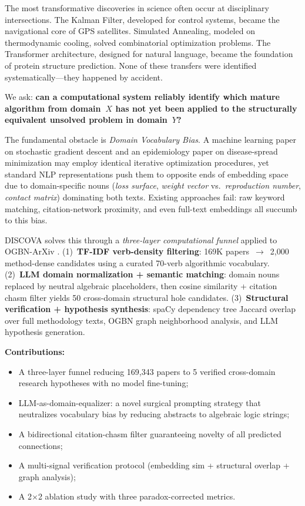 \documentclass[11pt]{article}
\begin{document}
The most transformative discoveries in science often occur at disciplinary
intersections. The Kalman Filter, developed for control systems, became
the navigational core of GPS satellites. Simulated Annealing, modeled on
thermodynamic cooling, solved combinatorial optimization problems. The
Transformer architecture, designed for natural language, became the
foundation of protein structure prediction. None of these transfers were
identified systematically---they happened by accident.

We ask: \textbf{can a computational system reliably identify which mature
algorithm from domain~$X$ has not yet been applied to the structurally
equivalent unsolved problem in domain~$Y$?}

The fundamental obstacle is \emph{Domain Vocabulary Bias}. A machine
learning paper on stochastic gradient descent and an epidemiology paper on
disease-spread minimization may employ identical iterative optimization
procedures, yet standard NLP representations push them to opposite ends of
embedding space due to domain-specific nouns (\textit{loss surface},
\textit{weight vector} vs.\ \textit{reproduction number},
\textit{contact matrix}) dominating both texts. Existing approaches fail:
raw keyword matching, citation-network proximity, and even full-text embeddings
all succumb to this bias.

DISCOVA solves this through a \emph{three-layer computational funnel}
applied to OGBN-ArXiv \citep{hu2020open}.
(1)~\textbf{TF-IDF verb-density filtering}: 169K papers~$\to$~2,000
method-dense candidates using a curated 70-verb algorithmic vocabulary.
(2)~\textbf{LLM domain normalization + semantic matching}: domain nouns
replaced by neutral algebraic placeholders, then cosine similarity + citation
chasm filter yields 50 cross-domain structural hole candidates.
(3)~\textbf{Structural verification + hypothesis synthesis}: spaCy dependency
tree Jaccard overlap over full methodology texts, OGBN graph neighborhood
analysis, and LLM hypothesis generation.

\textbf{Contributions:}
\begin{itemize}
\item A three-layer funnel reducing 169,343 papers to 5 verified
  cross-domain research hypotheses with no model fine-tuning;
\item LLM-as-domain-equalizer: a novel surgical prompting strategy that
  neutralizes vocabulary bias by reducing abstracts to algebraic logic strings;
\item A bidirectional citation-chasm filter guaranteeing novelty of all
  predicted connections;
\item A multi-signal verification protocol (embedding sim + structural
  overlap + graph analysis);
\item A 2$\times$2 ablation study with three paradox-corrected metrics.
\end{itemize}
\end{document}
